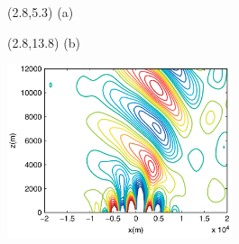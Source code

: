 \documentclass{article}
\begin{document}
\begin{textblock}{0.5}(2.8,5.3)
\normalsize
(a)
\end{textblock}
\begin{textblock}{0.5}(2.8,13.8)
\normalsize
(b)
\end{textblock}
\footnotesize
\hspace{0.06in}

\includegraphics[height=2in]{img/melvin-7a.png}
\end{document}

